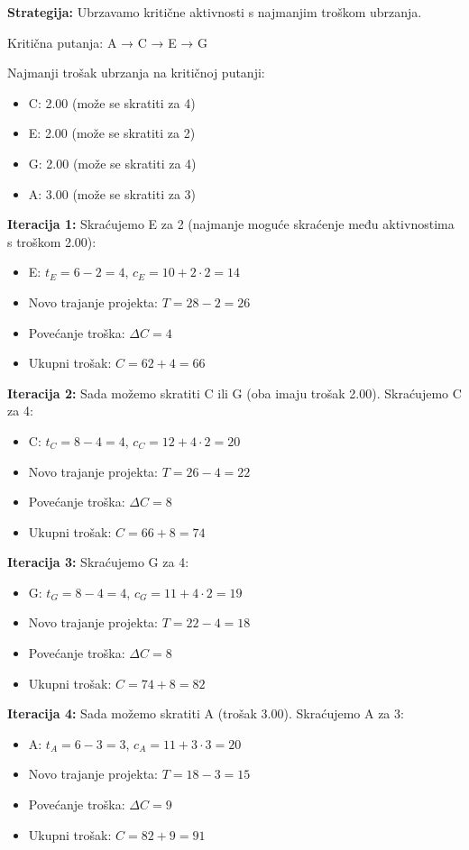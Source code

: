 \documentclass[12pt,a4paper]{article}
\begin{document}
\textbf{Strategija:} Ubrzavamo kritične aktivnosti s najmanjim troškom ubrzanja.

Kritična putanja: A → C → E → G

Najmanji trošak ubrzanja na kritičnoj putanji:
\begin{itemize}
\item C: 2.00 (može se skratiti za 4)
\item E: 2.00 (može se skratiti za 2)
\item G: 2.00 (može se skratiti za 4)
\item A: 3.00 (može se skratiti za 3)
\end{itemize}

\textbf{Iteracija 1:} Skraćujemo E za 2 (najmanje moguće skraćenje među aktivnostima s troškom 2.00):
\begin{itemize}
\item E: $t_E = 6 - 2 = 4$, $c_E = 10 + 2 \cdot 2 = 14$
\item Novo trajanje projekta: $T = 28 - 2 = 26$
\item Povećanje troška: $\Delta C = 4$
\item Ukupni trošak: $C = 62 + 4 = 66$
\end{itemize}

\textbf{Iteracija 2:} Sada možemo skratiti C ili G (oba imaju trošak 2.00). Skraćujemo C za 4:
\begin{itemize}
\item C: $t_C = 8 - 4 = 4$, $c_C = 12 + 4 \cdot 2 = 20$
\item Novo trajanje projekta: $T = 26 - 4 = 22$
\item Povećanje troška: $\Delta C = 8$
\item Ukupni trošak: $C = 66 + 8 = 74$
\end{itemize}

\textbf{Iteracija 3:} Skraćujemo G za 4:
\begin{itemize}
\item G: $t_G = 8 - 4 = 4$, $c_G = 11 + 4 \cdot 2 = 19$
\item Novo trajanje projekta: $T = 22 - 4 = 18$
\item Povećanje troška: $\Delta C = 8$
\item Ukupni trošak: $C = 74 + 8 = 82$
\end{itemize}

\textbf{Iteracija 4:} Sada možemo skratiti A (trošak 3.00). Skraćujemo A za 3:
\begin{itemize}
\item A: $t_A = 6 - 3 = 3$, $c_A = 11 + 3 \cdot 3 = 20$
\item Novo trajanje projekta: $T = 18 - 3 = 15$
\item Povećanje troška: $\Delta C = 9$
\item Ukupni trošak: $C = 82 + 9 = 91$
\end{itemize}
\end{document}
